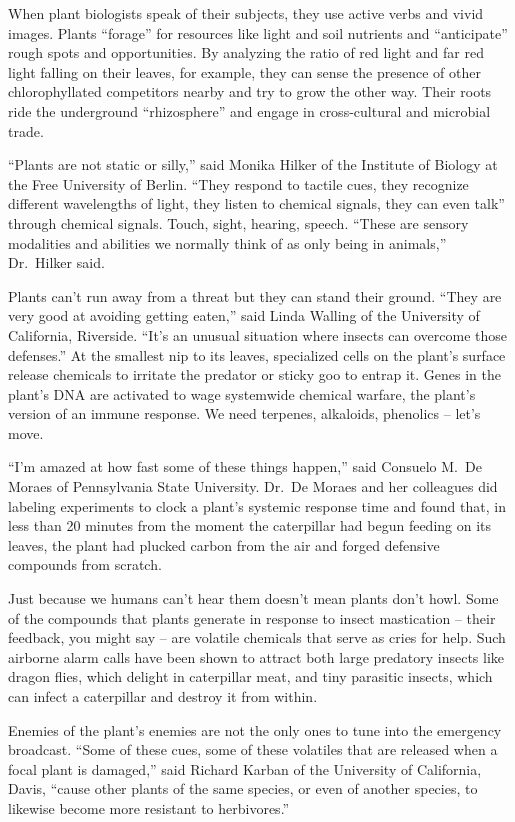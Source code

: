 ﻿\documentclass[12pt]{article}
\begin{document}
When plant biologists speak of their subjects, they use active verbs and vivid images. Plants
``forage'' for resources like light and soil nutrients and ``anticipate'' rough spots and
opportunities. By analyzing the ratio of red light and far red light falling on their leaves, for
example, they can sense the presence of other chlorophyllated competitors nearby and try to grow the
other way. Their roots ride the underground ``rhizosphere'' and engage in cross-cultural and
microbial trade.

``Plants are not static or silly,'' said Monika Hilker of the Institute of Biology at the Free
University of Berlin. ``They respond to tactile cues, they recognize different wavelengths of light,
they listen to chemical signals, they can even talk'' through chemical signals. Touch, sight,
hearing, speech. ``These are sensory modalities and abilities we normally think of as only being in
animals,'' Dr.~Hilker said.

Plants can't run away from a threat but they can stand their ground. ``They are very good at
avoiding getting eaten,'' said Linda Walling of the University of California, Riverside. ``It's an
unusual situation where insects can overcome those defenses.'' At the smallest nip to its leaves,
specialized cells on the plant's surface release chemicals to irritate the predator or sticky goo to
entrap it. Genes in the plant's DNA are activated to wage systemwide chemical warfare, the plant's
version of an immune response. We need terpenes, alkaloids, phenolics -- let's move.

``I'm amazed at how fast some of these things happen,'' said Consuelo M.~De Moraes of Pennsylvania
State University. Dr.~De Moraes and her colleagues did labeling experiments to clock a plant's
systemic response time and found that, in less than 20 minutes from the moment the caterpillar had
begun feeding on its leaves, the plant had plucked carbon from the air and forged defensive
compounds from scratch.

Just because we humans can't hear them doesn't mean plants don't howl. Some of the compounds that
plants generate in response to insect mastication -- their feedback, you might say -- are volatile
chemicals that serve as cries for help. Such airborne alarm calls have been shown to attract both
large predatory insects like dragon flies, which delight in caterpillar meat, and tiny parasitic
insects, which can infect a caterpillar and destroy it from within.

Enemies of the plant's enemies are not the only ones to tune into the emergency broadcast. ``Some of
these cues, some of these volatiles that are released when a focal plant is damaged,'' said Richard
Karban of the University of California, Davis, ``cause other plants of the same species, or even of
another species, to likewise become more resistant to herbivores.''
\end{document}
